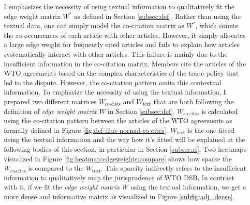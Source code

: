 I emphasizes the necessity of using textual information
to qualitatively fit the edge weight matrix $W^*$ as defined in Section \ref{subsec:def}. 
Rather than using the textual data, one can simply model the co-citation matrix as $W^*$, which counts the co-occurrences of each article with other articles.
However, it simply allocates a large edge weight for frequently cited articles and fails to explain how articles systematically interact with other articles.
This failure is mainly due to the insufficient information in the co-citation matrix. Members cite the articles of
the WTO agreements based on the complex characteristics of
the trade policy that led to the dispute. 
However, the co-citation pattern omits this contextual information. To emphasize the necessity of using the textual information, I prepared two different matrices $W_{\text{co-cites}}$ and $W_{\text{text}}$ that are both following the definition of \textit{edge weight matrix} $W$ in Section \ref{subsec:def}.
$W_{\text{co-cites}}$ is calculated using the co-citation pattern between the articles of the WTO agreements as formally defined
in Figure %
\ref{fig:def-illus-normal-co-cites}.
$W_{\text{text}}$ is the one fitted using the textual information and the way how it's fitted will be explained at the following bodies of this section, in particular in Section \ref{subsec:rf}.
Two heatmaps visualized in Figure \ref{fig:heatmap:edgeweights:compare} shows how sparse the $W_{\text{co-cites}}$ is compared to the $W_{\text{text}}$. This sparsity indirectly refers to the insufficient information
to qualitatively map the jurisprudence of WTO DSB.
In contrast with it, if we fit the \textit{edge weight matrix} $W$ using the textual information, we get a more dense and informative matrix as visualized in Figure \ref{subfig:adj_dense}.

